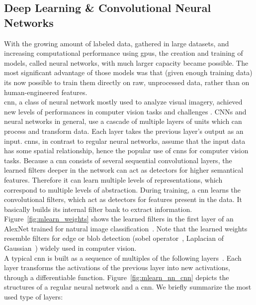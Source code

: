 \subsection{Deep Learning \& Convolutional Neural Networks} \label{sec:mlearn_nn_and_cnn}
With the growing amount of labeled data, gathered in large datasets, and increasing computational performance using \gls{gpu}s, the creation and training of models, called neural networks, with much larger capacity became possible. The most significant advantage of those models was that (given enough training data) its now possible to train them directly on raw, unprocessed data, rather than on human-engineered features.\\
\gls{cnn}, a class of neural network mostly used to analyze visual imagery, achieved new levels of performances in computer vision tasks and challenges \cite{Krizhevsky2012ImageNetNetworks,Simonyan2014VeryRecognition,Szegedy2014GoingConvolutions,He2015DeepRecognition,Zeiler2014VisualizingNetworks}. 
CNNs and neural networks in general, use a cascade of multiple layers of units which can process and transform data. Each layer takes the previous layer's output as an input. \gls{cnn}s, in contrast to regular neural networks, assume that the input data has some spatial relationship, hence the popular use of \gls{cnn}s for computer vision tasks. Because a \gls{cnn} consists of several sequential convolutional layers, the learned filters deeper in the network can act as detectors for higher semantical features. Therefore it can learn multiple levels of representations, which correspond to multiple levels of abstraction. During training, a \gls{cnn} learns the convolutional filters, which act as detectors for features present in the data. It basically builds its internal filter bank to extract information. Figure~\ref{fig:mlearn_weights} shows the learned filters in the first layer of an AlexNet trained for natural image classification~\cite{Russakovsky2015ImageNetChallenge}. Note that the learned weights resemble filters for edge or blob detection (sobel operator~\cite{Sobel1990AnOperator}, Laplacian of Gaussian~\cite{Marr187}) widely used in computer vision.\\
A typical \gls{cnn} is built as a sequence of multiples of the following layers~\cite{KarpathyStanfordRecognition}. Each layer transforms the activations of the previous layer into new activations, through a differentiable function. Figure~\ref{fig:mlearn_nn_cnn} depicts the structures of a regular neural network and a \gls{cnn}. We briefly summarize the most used type of layers:\\

